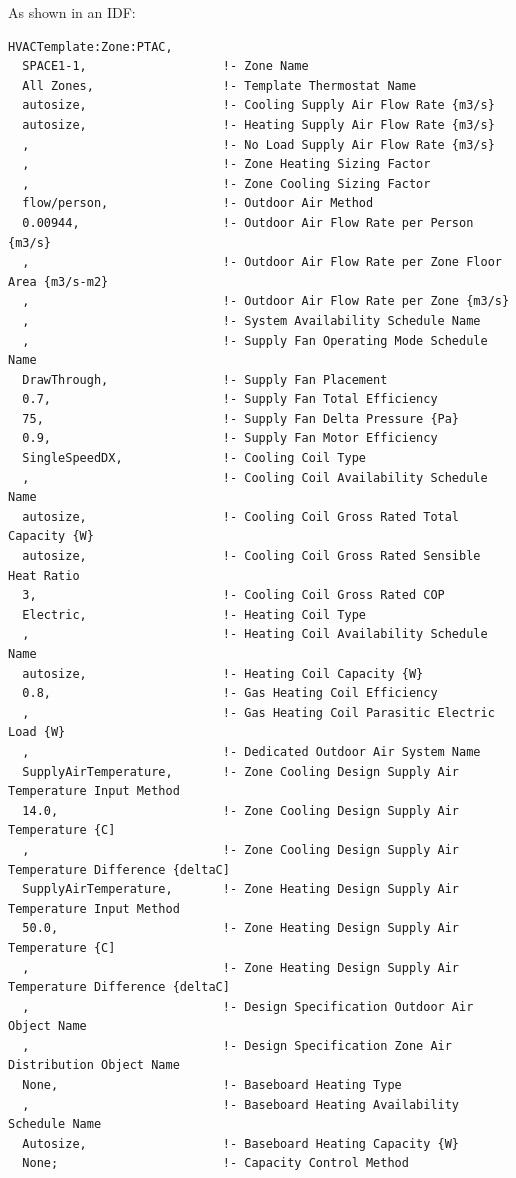 As shown in an IDF:

\begin{lstlisting}
HVACTemplate:Zone:PTAC,
  SPACE1-1,                   !- Zone Name
  All Zones,                  !- Template Thermostat Name
  autosize,                   !- Cooling Supply Air Flow Rate {m3/s}
  autosize,                   !- Heating Supply Air Flow Rate {m3/s}
  ,                           !- No Load Supply Air Flow Rate {m3/s}
  ,                           !- Zone Heating Sizing Factor
  ,                           !- Zone Cooling Sizing Factor
  flow/person,                !- Outdoor Air Method
  0.00944,                    !- Outdoor Air Flow Rate per Person {m3/s}
  ,                           !- Outdoor Air Flow Rate per Zone Floor Area {m3/s-m2}
  ,                           !- Outdoor Air Flow Rate per Zone {m3/s}
  ,                           !- System Availability Schedule Name
  ,                           !- Supply Fan Operating Mode Schedule Name
  DrawThrough,                !- Supply Fan Placement
  0.7,                        !- Supply Fan Total Efficiency
  75,                         !- Supply Fan Delta Pressure {Pa}
  0.9,                        !- Supply Fan Motor Efficiency
  SingleSpeedDX,              !- Cooling Coil Type
  ,                           !- Cooling Coil Availability Schedule Name
  autosize,                   !- Cooling Coil Gross Rated Total Capacity {W}
  autosize,                   !- Cooling Coil Gross Rated Sensible Heat Ratio
  3,                          !- Cooling Coil Gross Rated COP
  Electric,                   !- Heating Coil Type
  ,                           !- Heating Coil Availability Schedule Name
  autosize,                   !- Heating Coil Capacity {W}
  0.8,                        !- Gas Heating Coil Efficiency
  ,                           !- Gas Heating Coil Parasitic Electric Load {W}
  ,                           !- Dedicated Outdoor Air System Name
  SupplyAirTemperature,       !- Zone Cooling Design Supply Air Temperature Input Method
  14.0,                       !- Zone Cooling Design Supply Air Temperature {C]
  ,                           !- Zone Cooling Design Supply Air Temperature Difference {deltaC]
  SupplyAirTemperature,       !- Zone Heating Design Supply Air Temperature Input Method
  50.0,                       !- Zone Heating Design Supply Air Temperature {C]
  ,                           !- Zone Heating Design Supply Air Temperature Difference {deltaC]
  ,                           !- Design Specification Outdoor Air Object Name
  ,                           !- Design Specification Zone Air Distribution Object Name
  None,                       !- Baseboard Heating Type
  ,                           !- Baseboard Heating Availability Schedule Name
  Autosize,                   !- Baseboard Heating Capacity {W}
  None;                       !- Capacity Control Method
\end{lstlisting}


